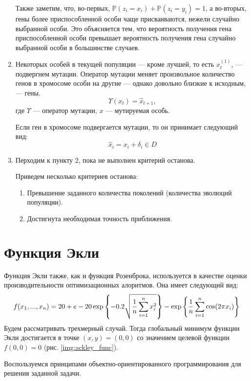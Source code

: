 \begin{enumerate}
Также заметим, что, во-первых, $\mathbb{P}(z_i = x_i) + \mathbb{P}(z_i = y_i) = 1$, а во-вторых, гены более приспособленной особи чаще присваиваются, нежели случайно выбранной особи. Это объясняется тем, что вероятность получения гена приспособленной особи превышает вероятность  получения гена случайно выбранной особи в большинстве случаев.

\item Некоторых особей в текущей популяции --- кроме лучшей, то есть $x_t^{(1)}$, --- подвергнем мутации. Оператор мутации меняет произвольное количество генов в хромосоме особи на другие
 --- однако довольно близкие к исходным, --- гены.
\begin{equation}
	\label{eq:mutation}
	\Upsilon(x_t) = \hat{x}_{t+1},
\end{equation}
где $\Upsilon$ --- оператор мутации, $x$ --- мутируемая особь.

Если ген в хромосоме подвергается мутации, то он принимает следующий вид:
\[
\hat{x}_i
= x_i + \delta_i \in D
\]

\item Перходим к пункту 2, пока не выполнен критерий останова.

	Приведем несколько критериев останова:
	\begin{enumerate}
			\item Превышение заданного количества поколений (количества эволюций популяции).
		\item Достигнута необходимая точность приближения.
	\end{enumerate}
\end{enumerate}

\section{Функция Экли}
\noindent
Функция Экли также, как и функция Розенброка, используется в качестве оценки производительности оптимизационных алоритмов. Она имеет следующий вид:
 \[
 	f(x_1, ..., x_n)
	=
	20
	+
	e
	-20\exp\left\{-0.2
	\sqrt{\dfrac{1}{n}
	\sum_{i=1}^n \limits x^2_i}
	\right\}
	-
	\exp\left\{
	\dfrac{1}{n}
	\sum_{i=1}^n \limits
	\cos(2\pi x_i)
	\right\}
 \]
 Будем рассматривать трехмерный случай. Тогда глобальный минимум функции Экли достигается в точке $(x, y) = (0, 0)$ со значением целевой функции $f(0, 0) = 0$ (рис. \ref{img:ackley_func}).

Воспользуемся принципами объектно-ориентированного программирования для решения заданной задачи.

